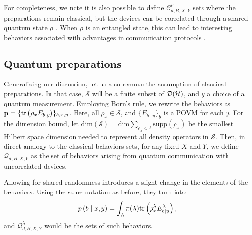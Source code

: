             For completeness, we note it is also possible to define $\mathcal{C}_{d,B,X,Y}^{\rho}$ sets where the preparations remain classical, but the devices can be correlated through a shared quantum state $\rho$ \cite{tavakoli_eapam_2021,poderini_pamcriteria_2020}. When $\rho$ is an entangled state, this can lead to interesting behaviors associated with advantages in communication protocols \cite{pawlowski_earacs_2010}.
    
        \subsection{Quantum preparations}
        \label{sec:quantum-behaviors}

            Generalizing our discussion, let us also remove the assumption of classical preparations. In that case, $\mathcal{S}$ will be a finite subset of $\mathcal{D}(\mathcal{H})$, and $y$ a choice of a quantum measurement. Employing Born's rule, we rewrite the behaviors as $\mathbf{p} = \{ \text{tr}\left( \rho_x E_{b \vert y} \right) \}_{b,x,y}$. Here, all $\rho_x \in \mathcal{S}$, and $\{ E_{b \mid y} \}_b$ is a POVM for each $y$. For the dimension bound, let $\text{dim}(\mathcal{S}) = \text{dim} \sum_{\rho_x \in \mathcal{S}}\text{supp}\left( \rho_x \right)$ be the smallest Hilbert space dimension needed to represent all density operators in $\mathcal{S}$. Then, in direct analogy to the classical behaviors sets, for any fixed $X$ and $Y$, we define $\mathcal{Q}_{d,B,X,Y}$ as the set of behaviors arising from quantum communication with uncorrelated devices.
            
            Allowing for shared randomness introduces a slight change in the elements of the behaviors. Using the same notation as before, they turn into
            $$
                p \left( b \mid x,y \right) =  \int_\Lambda \pi(\lambda) \text{tr}\left( \rho_x^\lambda E_{b \vert y}^\lambda \right) ,
            $$
			and $\mathcal{Q}^\lambda_{d,B,X,Y}$ would be the sets of such behaviors.
            
